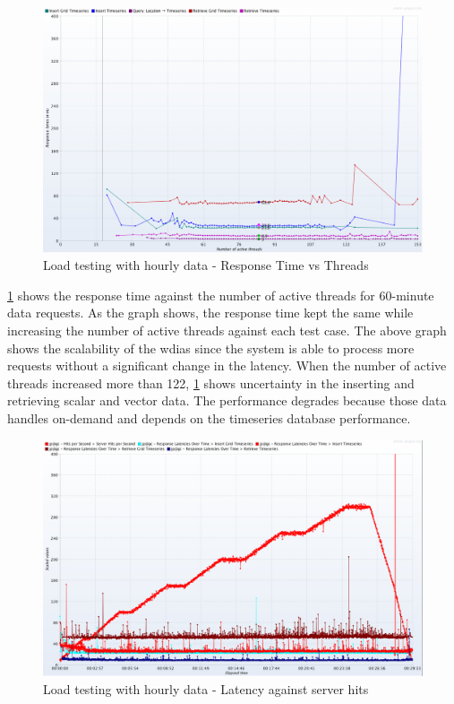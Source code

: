 \begin{figure}[htp]
    \centering
    \includegraphics[width=1.0\textwidth]{results/obs/all/obs_all_60m_response_times_vs_threads.png}
    \caption{Load testing with hourly data - Response Time vs Threads}
    \label{fi:test_obs_all_60m_response_vs_threads}
\end{figure}
\cref{fi:test_obs_all_60m_response_vs_threads} shows the response time against the number of active threads for 60-minute data requests. As the graph shows, the response time kept the same while increasing the number of active threads against each test case. The above graph shows the scalability of the \acrshort{wdias} since the system is able to process more requests without a significant change in the latency. When the number of active threads increased more than 122, \cref{fi:test_obs_all_60m_response_vs_threads} shows uncertainty in the inserting and retrieving scalar and vector data. The performance degrades because those data handles on-demand and depends on the timeseries database performance.

\begin{figure}[htp]
    \centering
    \includegraphics[width=1.0\textwidth]{results/obs/all/obs_all_60m_res_latencies_against_hits.png}
    \caption{Load testing with hourly data - Latency against server hits}
    \label{fi:test_obs_all_60m_latency}
\end{figure}

